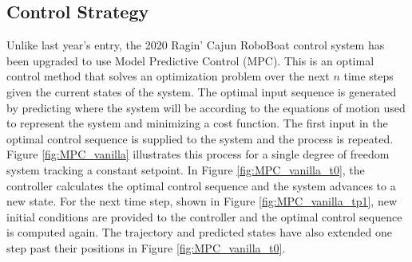 \documentclass[letterpaper, 12 pt, conference]{ieeeconf}
\begin{document}
\subsection{Control Strategy}
Unlike last year's entry, the 2020 Ragin' Cajun RoboBoat control system has been upgraded to use Model Predictive Control (MPC). This is an optimal control method that solves an optimization problem over the next $n$ time steps given the current states of the system. The optimal input sequence is generated by predicting where the system will be according to the equations of motion used to represent the system and minimizing a cost function. The first input in the optimal control sequence is supplied to the system and the process is repeated. Figure \ref{fig:MPC_vanilla} illustrates this process for a single degree of freedom system tracking a constant setpoint. In Figure \ref{fig:MPC_vanilla_t0}, the controller calculates the optimal control sequence and the system advances to a new state. For the next time step, shown in Figure \ref{fig:MPC_vanilla_tp1}, new initial conditions are provided to the controller and the optimal control sequence is computed again. The trajectory and predicted states have also extended one step past their positions in Figure \ref{fig:MPC_vanilla_t0}.
%
\end{document}
